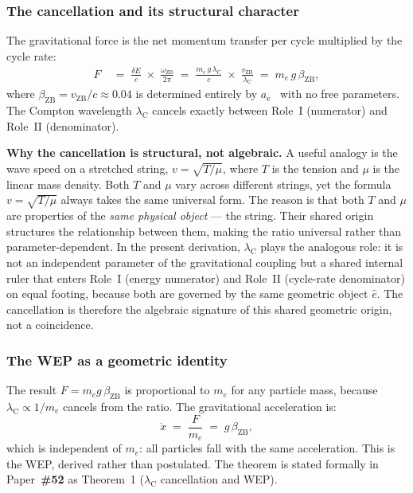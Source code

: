 \documentclass[12pt,letterpaper]{article}
\newcommand{\paperno}[1]{\textbf{\#{}#1}}
\newcommand{\vZB}{v_{\mathrm{ZB}}}
\newcommand{\lambdaC}{\lambda_{\mathrm{C}}}
\newcommand{\anom}{a_{\mathrm{e}}}
\newcommand{\omZB}{\omega_{\text{ZB}}}
\newcommand{\betaZB}{\beta_{\mathrm{ZB}}}
\begin{document}
\subsubsection{The cancellation and its structural character}

The gravitational force is the net momentum transfer per cycle multiplied by the cycle rate:
\begin{align}
F
&\;=\; \frac{\delta E}{c} \;\times\; \frac{\omZB}{2\pi}
\;=\; \frac{m_e\,g\,\lambdaC}{c} \;\times\; \frac{\vZB}{\lambdaC}
\;=\; m_e\,g\,\betaZB,
\label{eq:F_cancel_53}
\end{align}
where $\betaZB = \vZB/c \approx 0.04$ is determined entirely by $\anom$~\cite{hanamura10} with no free parameters.
The Compton wavelength $\lambdaC$ cancels exactly between Role~I (numerator) and Role~II (denominator).

\begin{mdframed}[style=orangebox]
\textbf{Why the cancellation is structural, not algebraic.} A useful analogy is the wave speed on a stretched string, $v = \sqrt{T/\mu}$, where $T$ is the tension and $\mu$ is the linear mass density. Both $T$ and $\mu$ vary across different strings, yet the formula $v = \sqrt{T/\mu}$ always takes the same universal form. The reason is that both $T$ and $\mu$ are properties of the \emph{same physical object} --- the string. Their shared origin structures the relationship between them, making the ratio universal rather than parameter-dependent. In the present derivation, $\lambdaC$ plays the analogous role: it is not an independent parameter of the gravitational coupling but a shared internal ruler that enters Role~I (energy numerator) and Role~II (cycle-rate denominator) on equal footing, because both are governed by the same geometric object $\hat{e}$. The cancellation is therefore the algebraic signature of this shared geometric origin, not a coincidence.
\end{mdframed}

\subsubsection{The WEP as a geometric identity}

The result $F = m_e g\,\betaZB$ is proportional to $m_e$ for any particle mass, because $\lambdaC \propto 1/m_e$ cancels from the ratio.
The gravitational acceleration is:
\begin{equation}
\ddot{x} \;=\; \frac{F}{m_e} \;=\; g\,\betaZB,
\label{eq:WEP_53}
\end{equation}
which is independent of $m_e$: all particles fall with the same acceleration.
This is the WEP, derived rather than postulated.
The theorem is stated formally in Paper~\paperno{52} as Theorem~1 ($\lambdaC$ cancellation and WEP).
\end{document}
